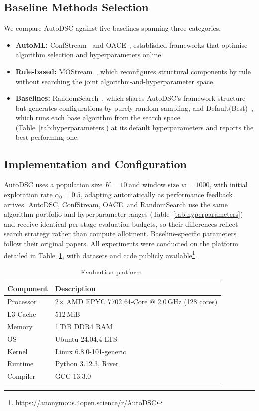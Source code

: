 \documentclass[conference]{IEEEtran}
\begin{document}
\subsection{Baseline Methods Selection}
We compare AutoDSC against five baselines spanning three categories.

\begin{itemize}
    \item \textbf{AutoML:} ConfStream~\cite{carnein2020confstream} and OACE~\cite{el2023onlineautoclust}, established frameworks that optimise algorithm selection and hyperparameters online.
    \item \textbf{Rule-based:} MOStream~\cite{wang2024mostream}, which reconfigures structural components by rule without searching the joint algorithm-and-hyperparameter space.
    \item \textbf{Baselines:} RandomSearch~\cite{bergstra2012random}, which shares AutoDSC's framework structure but generates configurations by purely random sampling, and Default(Best)~\cite{el2023onlineautoclust}, which runs each base algorithm from the search space (Table~\ref{tab:hyperparameters}) at its default hyperparameters and reports the best-performing one.
\end{itemize}

\subsection{Implementation and Configuration}
AutoDSC uses a population size $K=10$ and window size $w=1000$, with initial exploration rate $\alpha_0=0.5$, adapting automatically as performance feedback arrives. AutoDSC, ConfStream, OACE, and RandomSearch use the same algorithm portfolio and hyperparameter ranges (Table~\ref{tab:hyperparameters}) and receive identical per-stage evaluation budgets, so their differences reflect search strategy rather than compute allotment. Baseline-specific parameters follow their original papers. All experiments were conducted on the platform detailed in Table~\ref{tab:platform}, with datasets and code publicly available\footnote{\url{https://anonymous.4open.science/r/AutoDSC}}.

\begin{table}[t]
\centering
\caption{Evaluation platform.}
\label{tab:platform}
\begin{tabular}{|l|l|}
\hline
\textbf{Component} & \textbf{Description} \\
\hline
Processor   & 2$\times$ AMD EPYC 7702 64-Core @ 2.0\,GHz (128 cores) \\
\hline
L3 Cache    & 512\,MiB \\
\hline
Memory      & 1\,TiB DDR4 RAM \\
\hline
OS          & Ubuntu 24.04.4 LTS \\
\hline
Kernel      & Linux 6.8.0-101-generic \\
\hline
Runtime     & Python 3.12.3, River~\cite{montiel2021river} \\
\hline
Compiler    & GCC 13.3.0 \\
\hline
\end{tabular}
\end{table}
\end{document}
